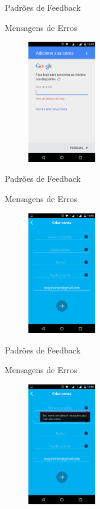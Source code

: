 \begin{frame}{Padrões de Feedback}
\begin{block}{Mensagens de Erros}
    \begin{figure}
    \includegraphics[width=3cm]{figuras/error/error3}
    \end{figure}
\end{block}
\end{frame}

\begin{frame}{Padrões de Feedback}
\begin{block}{Mensagens de Erros}
    \begin{figure}
    \includegraphics[width=3cm]{figuras/error/error4}
    \end{figure}
\end{block}
\end{frame}

\begin{frame}{Padrões de Feedback}
\begin{block}{Mensagens de Erros}
    \begin{figure}
    \includegraphics[width=3cm]{figuras/error/error5}
    \end{figure}
\end{block}
\end{frame}

